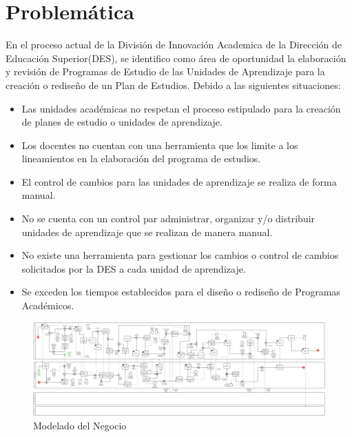 \section{Problemática}
En el proceso actual de la División de Innovación Academica de la Dirección de Educación Superior(DES), se identifico como área de oportunidad la elaboración y revisión de Programas de Estudio de las Unidades de Aprendizaje para la creación o rediseño de un Plan de Estudios. Debido a las siguientes situaciones:\\
\begin{itemize}
    \item Las unidades académicas no respetan el proceso estipulado para la creación de planes de estudio o unidades de aprendizaje.
    \item Los docentes no cuentan con una herramienta que los limite a los lineamientos en la elaboración del programa de estudios.
    \item El control de cambios para las unidades de aprendizaje se realiza de forma manual.
    \item No se cuenta con un control par administrar, organizar y/o distribuir unidades de aprendizaje que se realizan de manera manual.
    \item No existe una herramienta para gestionar los cambios o control de cambios solicitados por la DES a cada unidad de aprendizaje.
    \item Se exceden los tiempos establecidos para el diseño o rediseño de Programas Académicos.
\end{itemize}
\begin{figure}[H]
	\centering
	\includegraphics[width=0.9\linewidth]{images/Procesos/MacroProceso}
	\caption{Modelado del Negocio}
\end{figure}
